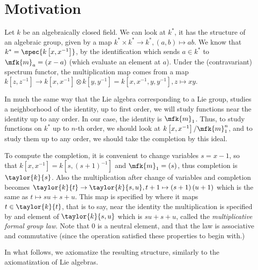 \section{Motivation}

Let $k$ be an algebraically closed field.
We can look at $k^*$, it has the structure of an algebraic group, given by a map
$
	k^* \times k^* \to k^*,
	\left(a,b\right) \mapsto ab
$.
We know that $k^* = \spec{k\left[x,x^{-1}\right]}$, by the identification which sends $a \in k^*$ to $\mfk{m}_a = \left(x-a\right)$ (which evaluate an element at $a$). Under the (contravariant) spectrum functor, the multiplication map comes from a map
$
	k\left[z,z^{-1}\right]
	\to
	k\left[x,x^{-1}\right] \otimes k\left[y,y^{-1}\right]
	= k\left[x,x^{-1},y,y^{-1}\right]
	,
	z \mapsto xy
$.

In much the same way that the Lie algebra corresponding to a Lie group, studies a neighborhood of the identity, up to first order,
we will study functions near the identity up to any order.
In our case, the identity is $\mfk{m}_1$.
Thus, to study functions on $k^*$ up to $n$-th order, we should look at $k\left[x,x^{-1}\right] / \mfk{m}_1^n$, and to study them up to any order, we should take the completion by this ideal.

To compute the completion, it is convenient to change variables $s = x-1$, so that $k\left[x,x^{-1}\right] = k\left[s,\left(s+1\right)^{-1}\right]$ and $\mfk{m}_1 = \left(s\right)$, thus completion is $\taylor{k}{s}$.
Also the multiplication after change of variables and completion becomes
$
	\taylor{k}{t}
	\to
	\taylor{k}{s,u},
	t+1 \mapsto \left(s+1\right)\left(u+1\right)
$
which is the same as $t \mapsto su+s+u$.
This map is specified by where it maps $t \in \taylor{k}{t}$,
that is to say, near the identity the multiplication is specified by and element of $\taylor{k}{s,u}$ which is $su+s+u$, called the \emph{multiplicative formal group law}.
Note that $0$ is a neutral element, and that the law is associative and commutative (since the operation satisfied these properties to begin with.)

In what follows, we axiomatize the resulting structure, similarly to the axiomatization of Lie algebras.